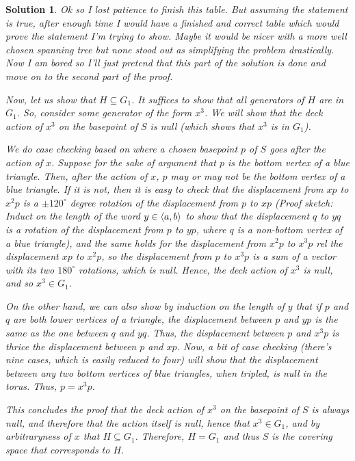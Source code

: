 \documentclass{article}
\theoremstyle{plain}
\theoremstyle{nonumberplain}
\newtheorem{sol}{Solution}
\DeclarePairedDelimiter{\braket}{\langle}{\rangle}
\begin{document}
\begin{sol}
Ok so I lost patience to finish this table. But assuming the statement is true, after enough time I would have a finished and correct table which would prove the statement I'm trying to show. Maybe it would be nicer with a more well chosen spanning tree but none stood out as simplifying the problem drastically. Now I am bored so I'll just pretend that this part of the solution is done and move on to the second part of the proof.

\smallskip

Now, let us show that $H \subseteq G_1$. It suffices to show that all generators of $H$ are in $G_1$. So, consider some generator of the form $x^3$. We will show that the deck action of $x^3$ on the basepoint of $S$ is null (which shows that $x^3$ is in $G_1$).

We do case checking based on where a chosen basepoint $p$ of $S$ goes after the action of $x$. Suppose for the sake of argument that $p$ is the bottom vertex of a blue triangle. Then, after the action of $x$, $p$ may or may not be the bottom vertex of a blue triangle. If it is not, then it is easy to check that the displacement from $xp$ to $x^2 p$ is a $\pm 120^\circ$ degree rotation of the displacement from $p$ to $xp$ (Proof sketch: Induct on the length of the word $y \in \braket{a,b}$ to show that the displacement $q$ to $yq$ is a rotation of the displacement from $p$ to $yp$, where $q$ is a non-bottom vertex of a blue triangle), and the same holds for the displacement from $x^2 p$ to $x^3 p$ rel the displacement $xp$ to $x^2 p$, so the displacement from $p$ to $x^3 p$ is a sum of a vector with its two $180^\circ$ rotations, which is null. Hence, the deck action of $x^3$ is null, and so $x^3 \in G_1$.

On the other hand, we can also show by induction on the length of $y$ that if $p$ and $q$ are both lower vertices of a triangle, the displacement between $p$ and $yp$ is the same as the one between $q$ and $yq$. Thus, the displacement between $p$ and $x^3 p$ is thrice the displacement between $p$ and $xp$. Now, a bit of case checking (there's nine cases, which is easily reduced to four) will show that the displacement between any two bottom vertices of blue triangles, when tripled, is null in the torus. Thus, $p = x^3 p$.

This concludes the proof that the deck action of $x^3$ on the basepoint of $S$ is always null, and therefore that the action itself is null, hence that $x^3 \in G_1$, and by arbitraryness of $x$ that $H \subseteq G_1$. Therefore, $H = G_1$ and thus $S$ is the covering space that corresponds to $H$.
\end{sol}
\end{document}
